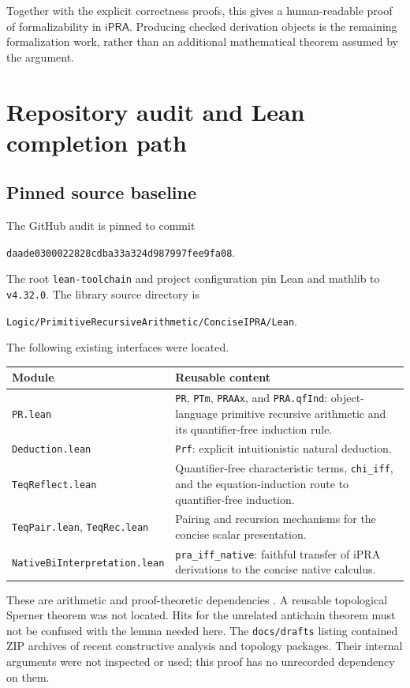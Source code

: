 \documentclass[11pt,a4paper]{article}
\theoremstyle{definition}
\newcommand{\ipra}{\mathsf{iPRA}}
\newcommand{\sha}{\texttt{daade0300022828cdba33a324d987997fee9fa08}}
\begin{document}
Together with the explicit correctness proofs, this gives a
human-readable proof of formalizability in $\ipra$.
Producing checked derivation objects is the remaining
formalization work, rather than an additional mathematical
theorem assumed by the argument.

\section{Repository audit and Lean completion path}\label{sec:repo}
\subsection{Pinned source baseline}
The GitHub audit is pinned to commit
\begin{center}\sha.\end{center}
The root \texttt{lean-toolchain} and project configuration
pin Lean and mathlib to \texttt{v4.32.0}.
The library source directory is
\begin{center}\small
\texttt{Logic/PrimitiveRecursiveArithmetic/ConciseIPRA/Lean}.
\end{center}
The following existing interfaces were located.

\begin{longtable}{>{\raggedright\arraybackslash}p{}p{}}
\toprule
Module & Reusable content\\
\midrule
\endhead
\texttt{PR.lean} &
\texttt{PR}, \texttt{PTm}, \texttt{PRAAx}, and
\texttt{PRA.qfInd}: object-language primitive recursive
arithmetic and its quantifier-free induction rule.\\
\texttt{Deduction.lean} &
\texttt{Prf}: explicit intuitionistic natural deduction.\\
\texttt{TeqReflect.lean} &
Quantifier-free characteristic terms, \texttt{chi\_iff},
and the equation-induction route to quantifier-free induction.\\
\texttt{TeqPair.lean}, \texttt{TeqRec.lean} &
Pairing and recursion mechanisms for the concise scalar presentation.\\
\texttt{NativeBiInterpretation.lean} &
\texttt{pra\_iff\_native}: faithful transfer of iPRA
derivations to the concise native calculus.\\
\bottomrule
\end{longtable}

These are arithmetic and proof-theoretic dependencies
\cite{proveit-pr,proveit-native,proveit-readme}.
A reusable topological Sperner theorem was not located.
Hits for the unrelated antichain theorem must not be
confused with the lemma needed here.
The \texttt{docs/drafts} listing contained ZIP archives
of recent constructive analysis and topology packages.
Their internal arguments were not inspected or used;
this proof has no unrecorded dependency on them.
\end{document}

